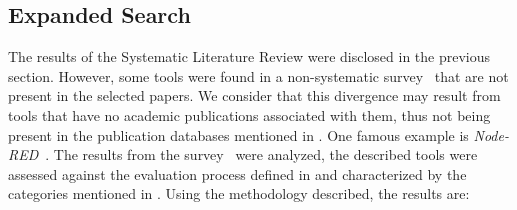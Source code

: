 \subsection{Expanded Search}\label{sec:slr_expanded_research}

The results of the Systematic Literature Review were disclosed in the previous section. However, some tools were found in a non-systematic survey~\cite{survey_vpl_iot} that are not present in the selected papers. We consider that this divergence may result from tools that have no academic publications associated with them, thus not being present in the publication databases mentioned in . One famous example is \textit{Node-RED}~\cite{node_red}. The results from the survey~\cite{survey_vpl_iot} were analyzed, the described tools were assessed against the evaluation process defined in  and characterized by the categories mentioned in . Using the methodology described, the results are:


